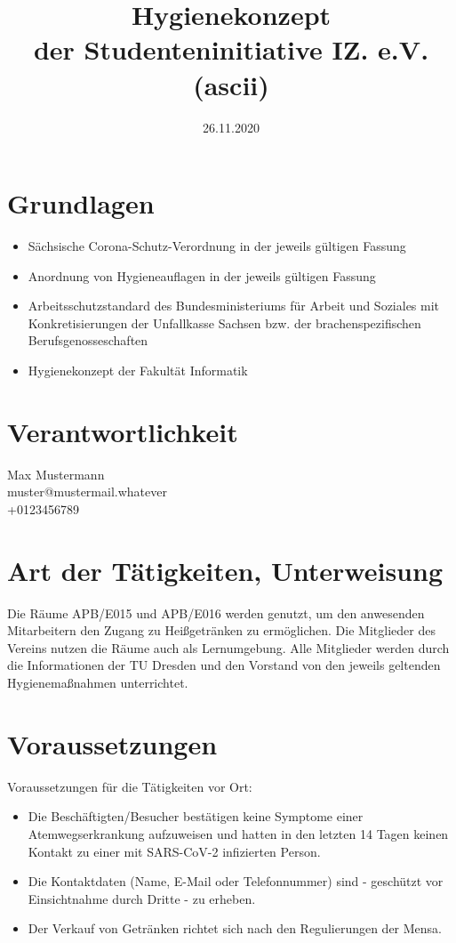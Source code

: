\documentclass[12pt]{article}
\title{Hygienekonzept\\der Studenteninitiative IZ. e.V. (ascii)}
\date{26.11.2020}
\author{}
\makeatletter
\newcommand*{\responsibleName}{Max Mustermann}
\newcommand*{\responsibleMail}{muster@mustermail.whatever}
\newcommand*{\responsiblePhone}{+0123456789}
\makeatother
\begin{document}
    \maketitle

    \section*{Grundlagen}

        \begin{itemize}
            \item Sächsische Corona-Schutz-Verordnung in der jeweils gültigen Fassung
            \item Anordnung von Hygieneauflagen in der jeweils gültigen Fassung
            \item Arbeitsschutzstandard des Bundesministeriums für Arbeit und Soziales mit Konkretisierungen der Unfallkasse Sachsen bzw. der brachenspezifischen Berufsgenosseschaften
            \item Hygienekonzept der Fakultät Informatik
        \end{itemize}

    \section*{Verantwortlichkeit}
        \responsibleName \\
        \responsibleMail \\
        \responsiblePhone

    \section{Art der Tätigkeiten, Unterweisung}
        Die Räume APB/E015 und APB/E016 werden genutzt, um den anwesenden Mitarbeitern den Zugang zu Heißgetränken zu ermöglichen.
        Die Mitglieder des Vereins nutzen die Räume auch als Lernumgebung.
        Alle Mitglieder werden durch die Informationen der TU Dresden und den Vorstand von den jeweils geltenden Hygienemaßnahmen unterrichtet.

    \section{Voraussetzungen}
        Voraussetzungen für die Tätigkeiten vor Ort:
        \begin{itemize}
            \item Die Beschäftigten/Besucher bestätigen keine Symptome einer Atemwegserkrankung aufzuweisen und hatten in den letzten 14 Tagen keinen Kontakt zu einer mit SARS-CoV-2 infizierten Person.
            \item Die Kontaktdaten (Name, E-Mail oder Telefonnummer) sind - geschützt vor Einsichtnahme durch Dritte - zu erheben.
            \item Der Verkauf von Getränken richtet sich nach den Regulierungen der Mensa.
        \end{itemize}
\end{document}
